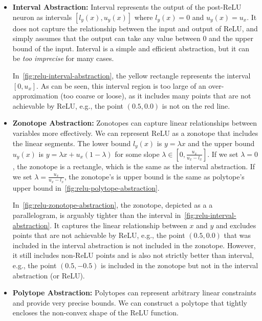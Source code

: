 \documentclass[oneside,11pt,dvipsnames]{book}
\numberwithin{equation}{section}
\theoremstyle{definition}
\theoremstyle{remark}
\begin{document}
\begin{itemize}
    \item \textbf{Interval Abstraction:} Interval represents the output of the post-ReLU neuron as intervals $[l_y(x), u_y(x)]$ where $l_y(x) = 0$ and $u_y(x) = u_x$. It does not capture the relationship between the input and output of ReLU, and simply assumes that the output can take any value between 0 and the upper bound of the input. Interval is a simple and efficient abstraction, but it can be \emph{too imprecise} for many cases.

    In~\autoref{fig:relu-interval-abstraction}, the \colorbox{yellowfill}{yellow rectangle} represents the interval $[0, u_x]$.  As can be seen, this interval region is too large of an over-approximation (too coarse or loose), as it includes many points that are not achievable by ReLU, e.g., the point $(0.5, 0.0)$ is not on the red line.

    \item \textbf{Zonotope Abstraction:} Zonotopes can capture linear relationships between variables more effectively. We can represent ReLU as a zonotope that includes the linear segments.  The lower bound $l_y(x)$ is $y = \lambda x$ and the upper bound $u_y(x)$ is $y = \lambda x + u_x(1 - \lambda)$ for some slope $\lambda \in [0, \frac{u_x}{u_x - l_x}]$. If we set $\lambda = 0$, the zonotope is a rectangle, which is the same as the interval abstraction. If we set $\lambda = \frac{u_x}{u_x - l_x}$, the zonotope's is upper bound is the same as polytope's upper bound in~\autoref{fig:relu-polytope-abstraction}.
    
    In~\autoref{fig:relu-zonotope-abstraction}, the zonotope, depicted as a \colorbox{yellowfill}{a parallelogram}, is arguably tighter than the interval in~\autoref{fig:relu-interval-abstraction}.  It captures the linear relationship between $x$ and $y$ and excludes points that are not achievable by ReLU, e.g., the point $(0.5, 0.0)$ that was included in the interval abstraction is not included in the zonotope. However, it still includes non-ReLU points and is also not strictly better than interval, e.g., the point $(0.5, -0.5)$ is included in the zonotope but not in the interval abstraction (or ReLU). 
    
    


    \item \textbf{Polytope Abstraction:} Polytopes can represent arbitrary linear constraints and provide very precise bounds. We can construct a polytope that tightly encloses the non-convex shape of the ReLU function.


\end{itemize}
\end{document}
